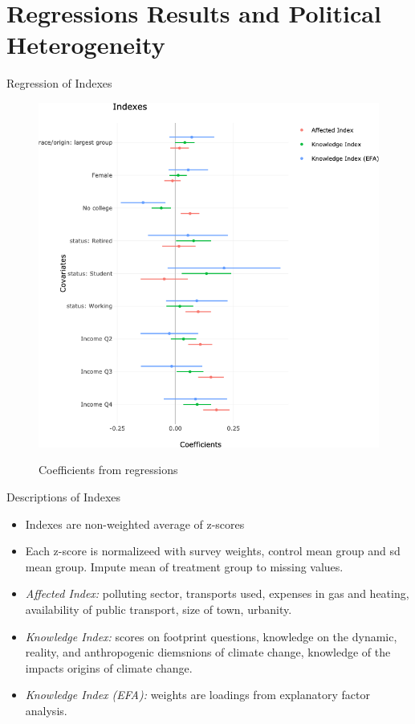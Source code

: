 \documentclass[aspectratio=169,9pt,dvipsnames]{beamer}
\begin{document}
\section{Regressions Results and Political Heterogeneity}

\begin{frame}{Regression of Indexes}%
\vspace{-.5cm}
\begin{figure}[h!]
\caption{Coefficients from regressions}
\includegraphics[width=.5\textwidth]{../figures/US/coef_indexes_US.png} \\
\end{figure}
\end{frame}

\begin{frame}{Descriptions of Indexes}
\begin{itemize}
  \item Indexes are non-weighted average of z-scores
  \item Each z-score is normalizeed with survey weights, control mean group and sd mean group. Impute mean of treatment group to missing values.
  \item \textit{Affected Index:} polluting sector, transports used, expenses in gas and heating, availability of public transport, size of town, urbanity.
  \item \textit{Knowledge Index:} scores on footprint questions, knowledge on the dynamic, reality, and anthropogenic diemsnions of climate change, knowledge of the impacts origins of climate change.
  \item \textit{Knowledge Index (EFA):} weights are loadings from explanatory factor analysis.
\end{itemize}
\end{frame}
\end{document}
